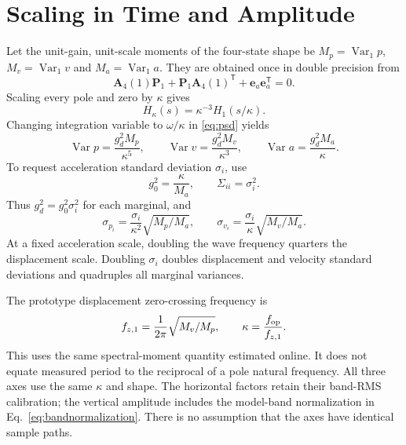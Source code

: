 \documentclass[conference]{IEEEtran}
\newcommand{\vc}[1]{\bm{#1}}
\newcommand{\mt}[1]{\bm{#1}}
\newcommand{\tr}{^{\mathsf T}}
\DeclareMathOperator{\Var}{Var}
\begin{document}
\section{Scaling in Time and Amplitude}
\label{sec:scaling}
Let the unit-gain, unit-scale moments of the four-state shape be
$M_p=\Var_1p$, $M_v=\Var_1v$ and $M_a=\Var_1a$. They are obtained once
in double precision from
\begin{equation}
 \mt A_4(1)\mt P_1+\mt P_1\mt A_4(1)\tr+
                  \vc e_a\vc e_a\tr=0.
 \label{eq:basecov}
\end{equation}
Scaling every pole and zero by $\kappa$ gives
\begin{equation}
 H_\kappa(s)=\kappa^{-3}H_1(s/\kappa).
 \label{eq:similarity}
\end{equation}
Changing integration variable to $\omega/\kappa$ in \cref{eq:psd} yields
\begin{equation}
 \Var p=\frac{g_d^2M_p}{\kappa^5},\qquad
 \Var v=\frac{g_d^2M_v}{\kappa^3},\qquad
 \Var a=\frac{g_d^2M_a}{\kappa}.
 \label{eq:momentscale}
\end{equation}
To request acceleration standard deviation $\sigma_i$, use
\begin{equation}
 g_0^2=\frac{\kappa}{M_a},\qquad \Sigma_{ii}=\sigma_i^2.
 \label{eq:gain}
\end{equation}
Thus $g_d^2=g_0^2\sigma_i^2$ for each marginal, and
\begin{equation}
 \sigma_{p_i}=\frac{\sigma_i}{\kappa^2}\sqrt{M_p/M_a},\qquad
 \sigma_{v_i}=\frac{\sigma_i}{\kappa}\sqrt{M_v/M_a}.
 \label{eq:motionstd}
\end{equation}
At a fixed acceleration scale, doubling the wave frequency quarters the
displacement scale. Doubling $\sigma_i$ doubles displacement and velocity
standard deviations and quadruples all marginal variances.

The prototype displacement zero-crossing frequency is
\begin{equation}
 f_{z,1}=\frac{1}{2\pi}\sqrt{M_v/M_p},\qquad
 \kappa=\frac{f_{\rm op}}{f_{z,1}}.
 \label{eq:kappa}
\end{equation}
This uses the same spectral-moment quantity estimated online. It does not
equate measured period to the reciprocal of a pole natural frequency.
All three axes use the same $\kappa$ and shape. The horizontal factors
retain their band-RMS calibration; the vertical amplitude includes the
model-band normalization in Eq.~\eqref{eq:bandnormalization}. There is no
assumption that the axes have identical sample paths.
\end{document}

